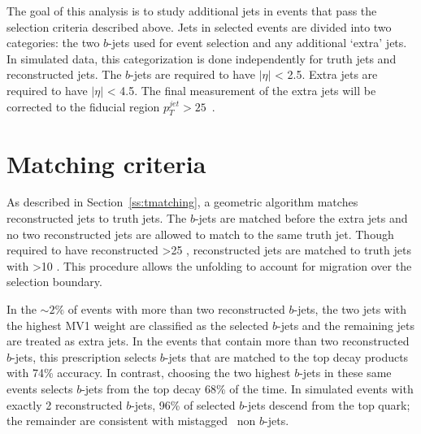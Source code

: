 
The goal of this analysis is to study additional jets in events that pass the selection criteria described above. 
Jets in selected events are divided into two categories: the two $b$-jets used for event selection and any additional `extra' jets. In simulated data, this categorization is done independently for truth jets and reconstructed jets. The $b$-jets are required to have $|\eta|$ < 2.5.  Extra jets are required to have  $|\eta|$ < 4.5. The final measurement of the extra jets will be corrected to the fiducial region $p_{T}^{jet} > 25$~\GeV.

\section{Matching criteria}
As described in Section~\ref{ss:tmatching}, a geometric algorithm matches reconstructed jets to truth jets. The $b$-jets are matched before the extra jets and no two reconstructed jets are allowed to match to the same truth jet. Though required to have reconstructed \pt>25 \GeV, reconstructed jets are matched to truth jets with \pt>10 \GeV. This procedure allows the unfolding to account for migration over the selection boundary.

In the $\sim 2\%$ of events with more than two reconstructed $b$-jets, the two jets with the highest MV1 weight are classified as the selected $b$-jets and the remaining jets are treated as extra jets. In the events that contain more than two reconstructed $b$-jets, this prescription selects $b$-jets that are matched to the top decay products with 74\% accuracy. In contrast, choosing the two highest \pt $b$-jets in these same events selects $b$-jets from the top decay 68\% of the time. In simulated events with exactly 2 reconstructed $b$-jets, 96\% of selected $b$-jets descend from the top quark; the remainder are consistent with mistagged~\cite{btagmiscal} non $b$-jets.



